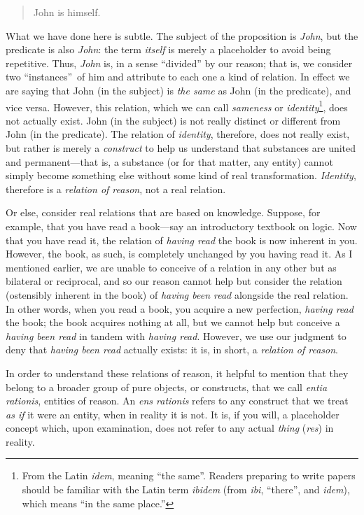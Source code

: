 \documentclass[
  12pt,
]{memoir}
\begin{document}
\begin{quote}
John is himself.
\end{quote}

\noindent What we have done here is subtle. The subject of the
proposition is \emph{John}, but the predicate is also \emph{John}: the
term \emph{itself} is merely a placeholder to avoid being repetitive.
Thus, \emph{John} is, in a sense ``divided'' by our reason; that is, we
consider two ``instances''~of him and attribute to each one a kind of
relation. In effect we are saying that John (in the subject) is
\emph{the same} as John (in the predicate), and vice versa. However,
this relation, which we can call \emph{sameness} or
\emph{identity}\footnote{From the Latin \emph{idem}, meaning ``the
  same''. Readers preparing to write papers should be familiar with the
  Latin term \emph{ibidem} (from \emph{ibi}, ``there'', and
  \emph{idem}), which means ``in the same place.''}, does not actually
exist. John (in the subject) is not really distinct or different from
John (in the predicate). The relation of \emph{identity}, therefore,
does not really exist, but rather is merely a \emph{construct} to help
us understand that substances are united and permanent---that is, a
substance (or for that matter, any entity) cannot simply become
something else without some kind of real transformation.
\emph{Identity}, therefore is a \emph{relation of reason}, not a real
relation.

Or else, consider real relations that are based on knowledge. Suppose,
for example, that you have read a book---say an introductory textbook on
logic. Now that you have read it, the relation of \emph{having read} the
book is now inherent in you. However, the book, as such, is completely
unchanged by you having read it. As I mentioned earlier, we are unable
to conceive of a relation in any other but as bilateral or reciprocal,
and so our reason cannot help but consider the relation (ostensibly
inherent in the book) of \emph{having been read} alongside the real
relation. In other words, when you read a book, you acquire a new
perfection, \emph{having read} the book; the book acquires nothing at
all, but we cannot help but conceive a \emph{having been read} in tandem
with \emph{having read}. However, we use our judgment to deny that
\emph{having been read} actually exists: it is, in short, a
\emph{relation of reason}.

In order to understand these relations of reason, it helpful to mention
that they belong to a broader group of pure objects, or constructs, that
we call \emph{entia rationis}, entities of reason. An \emph{ens
rationis} refers to any construct that we treat \emph{as if} it were an
entity, when in reality it is not. It is, if you will, a placeholder
concept which, upon examination, does not refer to any actual
\emph{thing} (\emph{res}) in reality.
\end{document}
